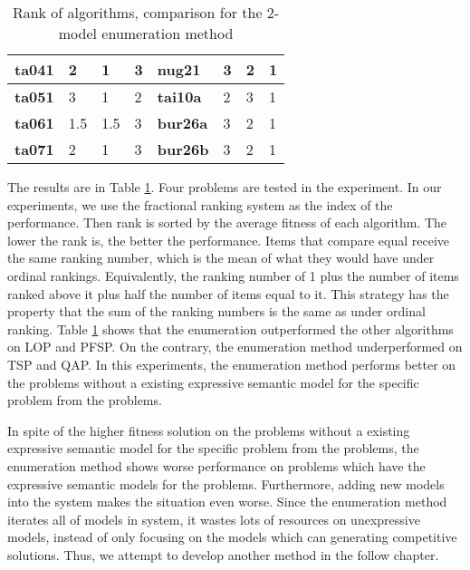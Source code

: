 \begin{table}[t]
\begin{tabular}{|l|l|l|l|l|l|l|l|}
    \textbf{ta041}    & 2              & 1              & 3         & \textbf{nug21}     & 3              & 2              & 1         \\ \hline
    \textbf{ta051}    & 3              & 1              & 2         & \textbf{tai10a}    & 2              & 3              & 1         \\ \hline
    \textbf{ta061}    & 1.5            & 1.5            & 3         & \textbf{bur26a}    & 3              & 2              & 1         \\ \hline
    \textbf{ta071}    & 2              & 1              & 3         & \textbf{bur26b}    & 3              & 2              & 1         \\ \hline
    \end{tabular}

\caption{Rank of algorithms, comparison for the 2-model enumeration method}
\label{tb:enumeration_case1}
\end{table}



The results are in Table \ref{tb:enumeration_case1}. Four problems are tested in the experiment. In our experiments, we use the fractional ranking system as the index of the performance. Then rank is sorted by the average fitness of each algorithm. The lower the rank is, the better the performance. Items that compare equal receive the same ranking number, which is the mean of what they would have under ordinal rankings. Equivalently, the ranking number of 1 plus the number of items ranked above it plus half the number of items equal to it. This strategy has the property that the sum of the ranking numbers is the same as under ordinal ranking. Table \ref{tb:enumeration_case1} shows that the enumeration outperformed the other algorithms on LOP and PFSP. On the contrary, the enumeration method underperformed on TSP and QAP. In this experiments, the enumeration method performs better on the problems without a existing expressive semantic model for the specific problem from the problems.


In spite of the higher fitness solution on the problems without a existing expressive semantic model for the specific problem from the problems, the enumeration method shows worse performance on problems which have the expressive semantic models for the problems. Furthermore, adding new models into the system makes the situation even worse. Since the enumeration method iterates all of models in system, it wastes lots of resources on unexpressive models, instead of only focusing on the models which can generating competitive solutions. Thus, we attempt to develop another method in the follow chapter.

